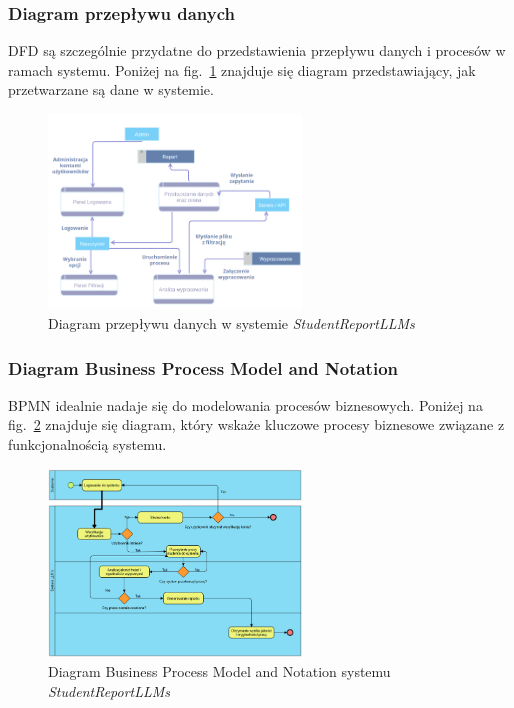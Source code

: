\documentclass[a4paper, 12pt]{article}
\begin{document}
\subsubsection*{Diagram przepływu danych}
DFD są szczególnie przydatne do przedstawienia przepływu danych i procesów w ramach systemu.
Poniżej na fig.~\ref{fig:dfd} znajduje się diagram przedstawiający, jak przetwarzane są dane w systemie.

\begin{figure}[H]
    \centering
    \includegraphics[width=0.6\textwidth]{img/DFD}
    \caption{Diagram przepływu danych w systemie \textit{StudentReportLLMs}}
    \label{fig:dfd}
\end{figure}

\subsubsection*{Diagram Business Process Model and Notation}
BPMN idealnie nadaje się do modelowania procesów biznesowych.
Poniżej na fig.~\ref{fig:BPMN} znajduje się diagram, który wskaże kluczowe procesy biznesowe związane z funkcjonalnością systemu.

\begin{figure}[H]
    \centering
    \includegraphics[width=0.6\textwidth]{img/BPMN}
    \caption{Diagram Business Process Model and Notation systemu \textit{StudentReportLLMs}}
    \label{fig:BPMN}
\end{figure}
\end{document}
